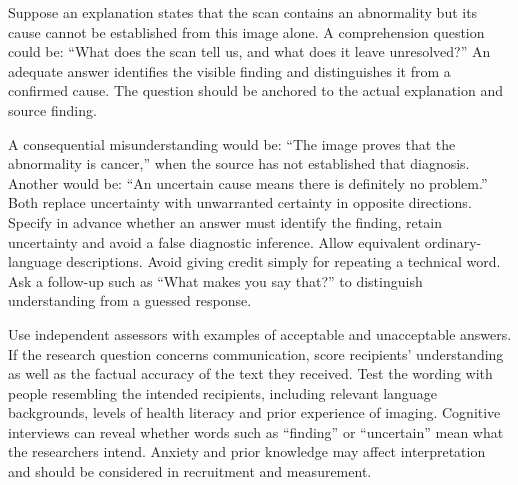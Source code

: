\biomedicalanswer
{}
Suppose an explanation states that the scan contains an abnormality but its cause cannot be established from this image alone. A comprehension question could be: ``What does the scan tell us, and what does it leave unresolved?'' An adequate answer identifies the visible finding and distinguishes it from a confirmed cause. The question should be anchored to the actual explanation and source finding.

A consequential misunderstanding would be: ``The image proves that the abnormality is cancer,'' when the source has not established that diagnosis. Another would be: ``An uncertain cause means there is definitely no problem.'' Both replace uncertainty with unwarranted certainty in opposite directions.
Specify in advance whether an answer must identify the finding, retain uncertainty and avoid a false diagnostic inference. Allow equivalent ordinary-language descriptions. Avoid giving credit simply for repeating a technical word. Ask a follow-up such as ``What makes you say that?'' to distinguish understanding from a guessed response.

Use independent assessors with examples of acceptable and unacceptable answers. If the research question concerns communication, score recipients' understanding as well as the factual accuracy of the text they received.
Test the wording with people resembling the intended recipients, including relevant language backgrounds, levels of health literacy and prior experience of imaging. Cognitive interviews can reveal whether words such as ``finding'' or ``uncertain'' mean what the researchers intend. Anxiety and prior knowledge may affect interpretation and should be considered in recruitment and measurement.

